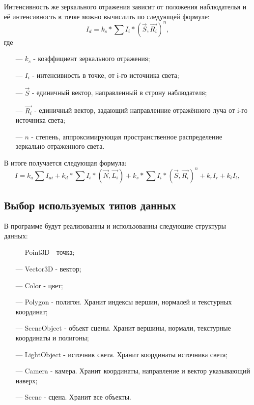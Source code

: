 Интенсивность же зеркального отражения зависит от положения наблюдателья и её интенсивность в точке можно вычислить по следующей формуле:
\[
I_{d} = k_{s} * \sum I_{i}*(\vec{S}, \vec{R_{i}})^n,
\]
где 
\begin{itemize}
	\item[---] $k_{s}$ - коэффициент зеркального отражения;
	\item[---] $I_{i}$ - интенсивность в точке, от i-го источника света;
	\item[---] $\vec{S}$ - единичный вектор, направленный в строну наблюдателя;
	\item[---] $\vec{R_{i}}$ - единичный вектор, задающий направленние отражённого луча от i-го источника света;
	\item[---] $n$ - степень, аппроксимирующая пространственное распределение зеркально отраженного света.
\end{itemize}

В итоге получается следующая формула:
\[
I = k_{a} \sum I_{ai} + k_{d} * \sum I_{i}*(\vec{N}, \vec{L_{i}}) + k_{s} * \sum I_{i}*(\vec{S}, \vec{R_{i}})^n + k_{r}I_{r} + k_{t}I_{t},
\]

\subsection{Выбор используемых типов данных}

В программе будут реализованны и использованны следующие структуры данных:
\begin{itemize}
	\item[---] Point3D - точка;
	\item[---] Vector3D - вектор;
	\item[---] Color - цвет;
	\item[---] Polygon - полигон. Хранит индексы вершин, нормалей и  текстурных координат;
	\item[---] SceneObject - объект сцены. Хранит вершины, нормали, текстурные координаты и полигоны;
	\item[---] LightObject - источник света. Хранит координаты источника света;
	\item[---] Camera - камера. Хранит координаты, направление и вектор указывающий наверх;
	\item[---] Scene - сцена. Хранит все объекты.
\end{itemize}

\pagebreak